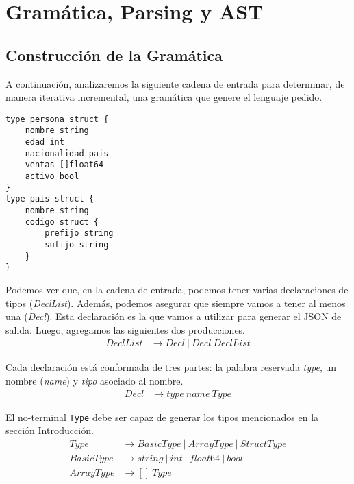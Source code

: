 \hypertarget{sec:gramatica}{\section{Gramática, Parsing y AST}}


\subsection{Construcción de la Gramática}

    A continuación, analizaremos la siguiente cadena de entrada para determinar, de manera iterativa incremental, una gramática que genere el lenguaje pedido.

\begin{verbatim}
type persona struct {
    nombre string
    edad int
    nacionalidad pais
    ventas []float64
    activo bool
}
type pais struct {
    nombre string
    codigo struct {
        prefijo string
        sufijo string
    }
}
\end{verbatim}

    Podemos ver que, en la cadena de entrada, podemos tener varias declaraciones de tipos (\textit{DeclList}). Además, podemos asegurar que siempre vamos a tener al menos una (\textit{Decl}). Esta declaración es la que vamos a utilizar para generar el JSON de salida. Luego, agregamos las siguientes dos producciones.
\begin{equation}
\begin{split}
DeclList & \rightarrow Decl~|~Decl~DeclList 
\end{split}
\end{equation}

    Cada declaración está conformada de tres partes: la palabra reservada \textit{type}, un nombre (\textit{name}) y \textit{tipo} asociado al nombre.
\begin{equation} \label{gram:decl}
\begin{split}
Decl & \rightarrow type~name~Type
\end{split}
\end{equation}

    El no-terminal \texttt{Type} debe ser capaz de generar los tipos mencionados en la sección \hyperlink{sec:intro}{Introducción}. 
\begin{equation} \label{gram:type}
\begin{split}
Type & \rightarrow BasicType~|~ArrayType~|~StructType \\
BasicType & \rightarrow string~|~int~|~float64~|~bool \\
ArrayType & \rightarrow []~Type
\end{split}
\end{equation}

